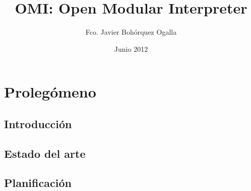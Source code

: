 \documentclass[a4paper,11pt]{book}
\title{OMI: Open Modular Interpreter}
\author{Fco. Javier Bohórquez Ogalla}
\date{Junio 2012}
\begin{document}
\pagestyle{empty}


\cleardoublepage


\cleardoublepage


\newpage


\newpage


\frontmatter

\tableofcontents
\listoffigures
\renewcommand{\listtablename}{Índice de tablas}
\listoftables

\mainmatter

\part{Prolegómeno}
\pagestyle{plain}
\chapter{Introducción}


\chapter{Estado del arte}


\chapter{Planificación}


\end{document}
